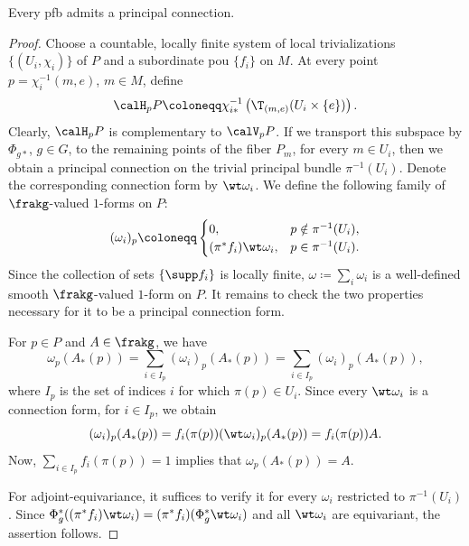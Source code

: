 \begin{prop}
    Every \gls{pfb} admits a principal connection.
\end{prop}
\begin{proof}
    Choose a countable, locally finite system of local trivializations $\{(U_i,\chi_i)\}$ of $P$ and a subordinate \gls{pou} $\{f_i\}$ on $M$. At every point $p=\chi_i^{-1}(m,e)$, $m\in M$, define
    \[\calH_pP\coloneqq \chi_{i\ast}^{-1} \left(\T_{(m,e)}(U_i\times\{e\})\right).\]
    Clearly, $\calH_pP$ is complementary to $\calV_pP$. If we transport this subspace by $\Phi_{g\ast}$, $g\in G$, to the remaining points of the fiber $P_m$, for every $m\in U_i$, then we obtain a principal connection on the trivial principal bundle $\pi^{-1}(U_i)$. Denote the corresponding connection form by $\wt\omega_i$. We define the following family of $\frakg$-valued $1$-forms on $P$:
    \[(\omega_i)_p\coloneqq 
    \begin{cases}
        0,&p\notin \pi^{-1}(U_i),\\
        (\pi^\ast f_i)\wt\omega_i, & p\in\pi^{-1}(U_i).
    \end{cases}
    \]
    Since the collection of sets $\{\supp f_i\}$ is locally finite, $\omega\coloneqq\sum_i \omega_i$ is a well-defined smooth $\frakg$-valued $1$-form on $P$. It remains to check the two properties necessary for it to be a principal connection form.

    For $p\in P$ and $A\in\frakg$, we have
    \[\omega_p(A_\ast(p))=\sum_{i\in I_p} (\omega_i)_p(A_\ast(p))=\sum_{i\in I_p} (\omega_i)_p(A_\ast(p)),\]
    where $I_p$ is the set of indices $i$ for which $\pi(p)\in U_i$. Since every $\wt\omega_i$ is a connection form, for $i\in I_p$, we obtain
    \[(\omega_i)_p(A_\ast(p))=f_i(\pi(p))(\wt\omega_i)_p(A_\ast(p))=f_i(\pi(p))A.\]
    Now, $\sum_{i\in I_p} f_i(\pi(p))=1$ implies that $\omega_p(A_\ast(p))=A$.

    For adjoint-equivariance, it suffices to verify it for every $\omega_i$ restricted to $\pi^{-1}(U_i)$. Since  $\Phi_g^\ast((\pi^\ast f_i)\wt\omega_i)=(\pi^\ast f_i)(\Phi_g^\ast \wt\omega_i)$ and all $\wt\omega_i$ are equivariant, the assertion follows.
\end{proof}

